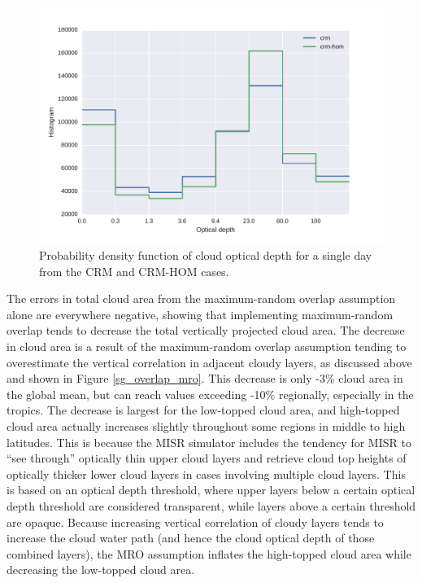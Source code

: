 \begin{figure}
\centering
\includegraphics[width=\columnwidth]{graphics/taudist_hom.pdf}
\caption{Probability density function of cloud optical depth for a single day from the CRM and CRM-HOM cases.}
\label{sg_cldtau_distribution}
\end{figure}

The errors in total cloud area from the maximum-random overlap assumption alone are everywhere negative, showing that implementing maximum-random overlap tends to decrease the total vertically projected cloud area. The decrease in cloud area is a result of the maximum-random overlap assumption tending to overestimate the vertical correlation in adjacent cloudy layers, as discussed above and shown in Figure \ref{sg_overlap_mro}. This decrease is only -3\% cloud area in the global mean, but can reach values exceeding -10\% regionally, especially in the tropics. The decrease is largest for the low-topped cloud area, and high-topped cloud area actually increases slightly throughout some regions in middle to high latitudes. This is because the MISR simulator includes the tendency for MISR to ``see through'' optically thin upper cloud layers and retrieve cloud top heights of optically thicker lower cloud layers in cases involving multiple cloud layers. This is based on an optical depth threshold, where upper layers below a certain optical depth threshold are considered transparent, while layers above a certain threshold are opaque. Because increasing vertical correlation of cloudy layers tends to increase the cloud water path (and hence the cloud optical depth of those combined layers), the MRO assumption inflates the high-topped cloud area while decreasing the low-topped cloud area.

